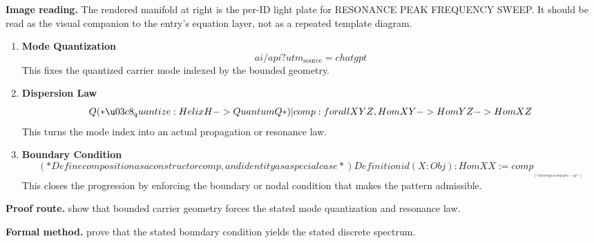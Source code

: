\begin{samepage}
\noindent\begin{minipage}[t]{0.45\linewidth}
\vspace{0pt}
\raggedright
\scriptsize\textbf{Image reading.} The rendered manifold at right is the per-ID light plate for RESONANCE PEAK FREQUENCY SWEEP. It should be read as the visual companion to the entry's equation layer, not as a repeated template diagram.\par
\end{minipage}\hfill
\begin{minipage}[t]{0.53\linewidth}
\vspace*{-0.10in}
\raggedright
{}
\end{minipage}
\end{samepage}

\clearpage


\begin{enumerate}[leftmargin=1.6em,itemsep=9pt,topsep=6pt]
\item \textbf{Mode Quantization}
\[
ai/api?utm_{\mathrm{source}}=chatgpt
\]
This fixes the quantized carrier mode indexed by the bounded geometry.

\item \textbf{Dispersion Law}
\[
Q (* \u03c8_quantize: HelixH -> QuantumQ *)  | comp : forall {X Y Z}, Hom X Y -> Hom Y Z -> Hom X Z
\]
This turns the mode index into an actual propagation or resonance law.

\item \textbf{Boundary Condition}
\[
(* Define composition as a constructor comp, and identity as a special case *) Definition id (X: Obj) : Hom X X := comp _ _ _ (* identity as comp of no-op *)
\]
This closes the progression by enforcing the boundary or nodal condition that makes the pattern admissible.
\end{enumerate}

\textbf{Proof route.} show that bounded carrier geometry forces the stated mode quantization and resonance law.

\textbf{Formal method.} prove that the stated boundary condition yields the stated discrete spectrum.

\medskip
{}

